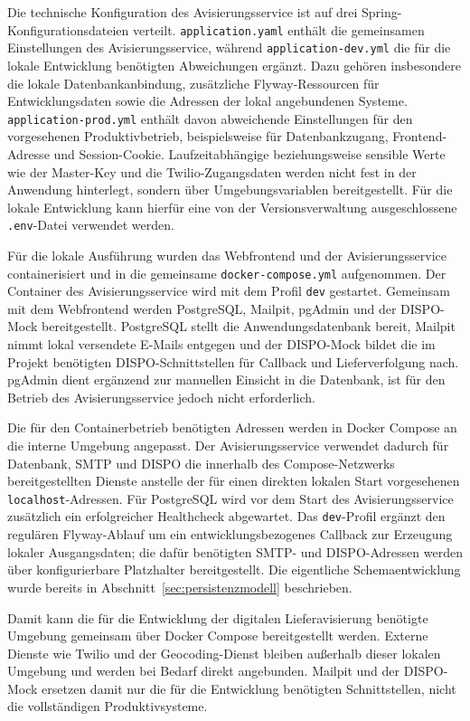Die technische Konfiguration des Avisierungsservice ist auf drei
Spring-Konfigurationsdateien verteilt. \texttt{application.yaml} enthält die
gemeinsamen Einstellungen des Avisierungsservice, während
\texttt{application-dev.yml} die für die lokale Entwicklung benötigten
Abweichungen ergänzt. Dazu gehören insbesondere die lokale Datenbankanbindung,
zusätzliche Flyway-Ressourcen für Entwicklungsdaten sowie die Adressen der
lokal angebundenen Systeme. \texttt{application-prod.yml} enthält davon
abweichende Einstellungen für den vorgesehenen Produktivbetrieb,
beispielsweise für Datenbankzugang, Frontend-Adresse und Session-Cookie.
Laufzeitabhängige beziehungsweise sensible Werte wie der Master-Key und die
Twilio-Zugangsdaten werden nicht fest in der Anwendung hinterlegt, sondern
über Umgebungsvariablen bereitgestellt. Für die lokale Entwicklung kann
hierfür eine von der Versionsverwaltung ausgeschlossene \texttt{.env}-Datei
verwendet werden.

Für die lokale Ausführung wurden das Webfrontend und der Avisierungsservice
containerisiert und in die gemeinsame \texttt{docker-compose.yml} aufgenommen.
Der Container des Avisierungsservice wird mit dem Profil \texttt{dev} gestartet.
Gemeinsam mit dem Webfrontend werden PostgreSQL, Mailpit, pgAdmin und der
DISPO-Mock bereitgestellt. PostgreSQL stellt die Anwendungsdatenbank bereit,
Mailpit nimmt lokal versendete E-Mails entgegen und der DISPO-Mock bildet die im
Projekt benötigten DISPO-Schnittstellen für Callback und Lieferverfolgung nach.
pgAdmin dient ergänzend zur manuellen Einsicht in die Datenbank, ist für den
Betrieb des Avisierungsservice jedoch nicht erforderlich.

Die für den Containerbetrieb benötigten Adressen werden in Docker Compose an
die interne Umgebung angepasst. Der Avisierungsservice verwendet dadurch für
Datenbank, SMTP und DISPO die innerhalb des Compose-Netzwerks bereitgestellten
Dienste anstelle der für einen direkten lokalen Start vorgesehenen
\texttt{localhost}-Adressen. Für PostgreSQL wird vor dem Start des
Avisierungsservice zusätzlich ein erfolgreicher Healthcheck abgewartet. Das
\texttt{dev}-Profil ergänzt den regulären Flyway-Ablauf um ein
entwicklungsbezogenes Callback zur
Erzeugung lokaler Ausgangsdaten; die dafür benötigten SMTP- und DISPO-Adressen
werden über konfigurierbare Platzhalter bereitgestellt. Die eigentliche
Schemaentwicklung wurde bereits in Abschnitt~\ref{sec:persistenzmodell}
beschrieben.

Damit kann die für die Entwicklung der digitalen Lieferavisierung benötigte
Umgebung gemeinsam über Docker Compose bereitgestellt werden. Externe Dienste
wie Twilio und der Geocoding-Dienst bleiben außerhalb dieser lokalen Umgebung
und werden bei Bedarf direkt angebunden. Mailpit und der DISPO-Mock ersetzen
damit nur die für die Entwicklung benötigten Schnittstellen, nicht die
vollständigen Produktivsysteme.

\clearpage

